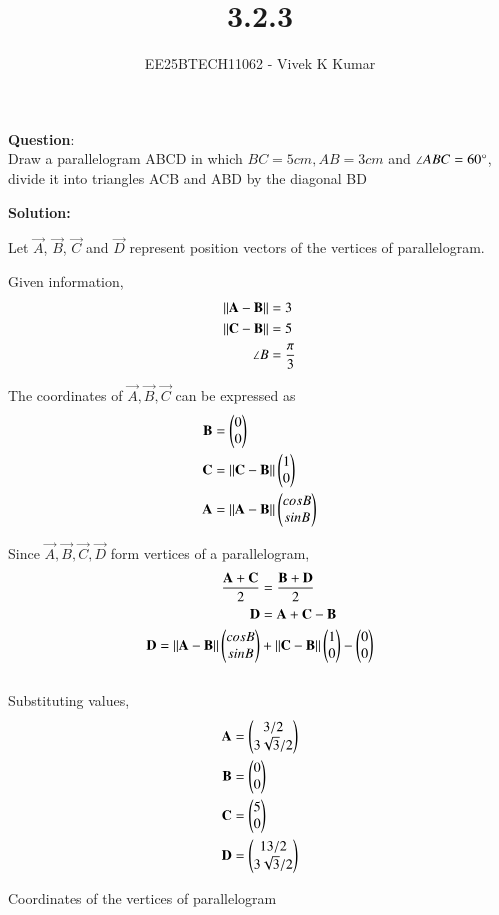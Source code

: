 \documentclass[journal]{IEEEtran}
\title{3.2.3}
\author{EE25BTECH11062 - Vivek K Kumar}
\begin{document}
\maketitle

\renewcommand{\thefigure}{\theenumi}
\renewcommand{\thetable}{\theenumi}


\textbf{Question}:\\
Draw a parallelogram ABCD in which $BC = 5cm, AB = 3cm$ and $\angle ABC = 60\degree$, divide it into triangles ACB and ABD by the diagonal BD

\textbf{Solution: }

Let $\vec{A}$, $\vec{B}$, $\vec{C}$ and $\vec{D}$ represent position vectors of the vertices of parallelogram.

Given information, 
\begin{align}
\left\lVert\mathbf{A-B}\right\rVert &= 3 \\
\left\lVert\mathbf{C-B}\right\rVert &= 5 \\
\angle B &= \frac{\pi}{3}
\end{align}

The coordinates of $\vec{A}, \vec{B}, \vec{C}$ can be expressed as
\begin{align}
\mathbf{B} &= \begin{pmatrix}0\\0\end{pmatrix} \\
\mathbf{C} &= \left\lVert\mathbf{C-B}\right\rVert\begin{pmatrix}1\\0\end{pmatrix} \\
\mathbf{A} &= \left\lVert\mathbf{A-B}\right\rVert\begin{pmatrix}cosB\\sinB\end{pmatrix} 
\end{align}

Since $\vec{A}, \vec{B}, \vec{C}, \vec{D}$ form vertices of a parallelogram,
\begin{align}
\frac{\mathbf{A}+\mathbf{C}}{2} &= \frac{\mathbf{B}+\mathbf{D}}{2} \\
\mathbf{D} &= \mathbf{A+C-B}\\
\mathbf{D} = \left\lVert\mathbf{A}-\mathbf{B}\right\rVert\begin{pmatrix}cosB\\sinB\end{pmatrix} &+  \left\lVert\mathbf{C}-\mathbf{B}\right\rVert\begin{pmatrix}1\\0\end{pmatrix} - \begin{pmatrix}0\\0\end{pmatrix}
\end{align}
\\
Substituting values, 
\begin{align}
    \mathbf{A} &= \begin{pmatrix}3/2 \\ 3\sqrt{3}/{2}\end{pmatrix} \\
    \mathbf{B} &= \begin{pmatrix}0 \\ 0\end{pmatrix} \\
    \mathbf{C} &= \begin{pmatrix}5 \\ 0\end{pmatrix} \\
    \mathbf{D} &= \begin{pmatrix}13/2 \\ 3\sqrt{3}/2\end{pmatrix}
\end{align}
\begin{table}[H]    
  \centering
  
  \caption{Coordinates of the vertices of parallelogram}
  \label{tab:3.2.3}
\end{table}
\end{document}
